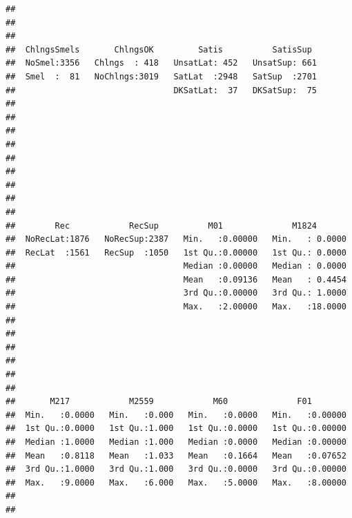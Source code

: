 \documentclass[11pt,]{article}
\begin{document}
\begin{verbatim}
##                                                                    
##                                                                    
##                                                                    
##  ChlngsSmels       ChlngsOK         Satis          SatisSup   
##  NoSmel:3356   Chlngs  : 418   UnsatLat: 452   UnsatSup: 661  
##  Smel  :  81   NoChlngs:3019   SatLat  :2948   SatSup  :2701  
##                                DKSatLat:  37   DKSatSup:  75  
##                                                               
##                                                               
##                                                               
##                                                               
##                                                               
##                                                               
##                                                               
##                                                               
##                                                               
##        Rec            RecSup          M01              M1824        
##  NoRecLat:1876   NoRecSup:2387   Min.   :0.00000   Min.   : 0.0000  
##  RecLat  :1561   RecSup  :1050   1st Qu.:0.00000   1st Qu.: 0.0000  
##                                  Median :0.00000   Median : 0.0000  
##                                  Mean   :0.09136   Mean   : 0.4454  
##                                  3rd Qu.:0.00000   3rd Qu.: 1.0000  
##                                  Max.   :2.00000   Max.   :18.0000  
##                                                                     
##                                                                     
##                                                                     
##                                                                     
##                                                                     
##                                                                     
##       M217            M2559            M60              F01         
##  Min.   :0.0000   Min.   :0.000   Min.   :0.0000   Min.   :0.00000  
##  1st Qu.:0.0000   1st Qu.:1.000   1st Qu.:0.0000   1st Qu.:0.00000  
##  Median :1.0000   Median :1.000   Median :0.0000   Median :0.00000  
##  Mean   :0.8118   Mean   :1.033   Mean   :0.1664   Mean   :0.07652  
##  3rd Qu.:1.0000   3rd Qu.:1.000   3rd Qu.:0.0000   3rd Qu.:0.00000  
##  Max.   :9.0000   Max.   :6.000   Max.   :5.0000   Max.   :8.00000  
##                                                                     
##                                                                     

\end{verbatim}
\end{document}
